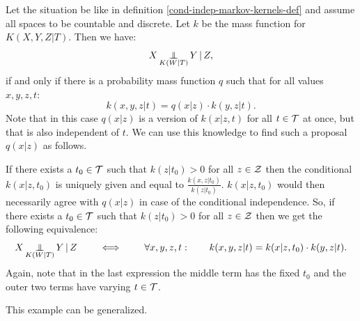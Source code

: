 \begin{Eg}
    Let the situation be like in definition \ref{cond-indep-markov-kernels-def} and assume all spaces to be countable and discrete.
    Let $k$ be the mass function for $K(X,Y,Z|T)$.
    Then we have: 
    \[X \operatorname*{\perp\mkern-11mu\perp}_{K(W|T)} Y \operatorname*{|} Z, \]
    if and only if there is a probability mass function $q$ such that for all values $x,y,z,t$:
    \[ k(x,y,z|t) = q(x|z) \cdot k(y,z|t). \]
    Note that in this case $q(x|z)$ is a version of $k(x|z,t)$ for all $t \in \mathcal{T}$ at once, but that is also independent of $t$.
    We can use this knowledge to find such a proposal $q(x|z)$ as follows.

    If there exists a $t_0 \in \mathcal{T}$ such that $k(z|t_0) >0$ for all  $z \in \mathcal{Z}$ then the 
    conditional $k(x|z,t_0)$ is uniquely given and equal to $\frac{k(x,z|t_0)}{k(z|t_0)}$.
    $k(x|z,t_0)$ would then necessarily agree with $q(x|z)$ in case of the conditional independence.
    So, if there exists a $t_0 \in \mathcal{T}$ such that $k(z|t_0) >0$ for all $z \in \mathcal{Z}$ then 
    we get the following equivalence:
    \[X \operatorname*{\perp\mkern-11mu\perp}_{K(W|T)} Y \operatorname*{|} Z \qquad \iff \qquad \forall x,y,z,t: \qquad k(x,y,z|t) = k(x|z,t_0) \cdot k(y,z|t). \]
    Again, note that in the last expression the middle term has the fixed $t_0$ and the outer two terms have varying $t \in \mathcal{T}$.
\end{Eg}

This example can be generalized.


